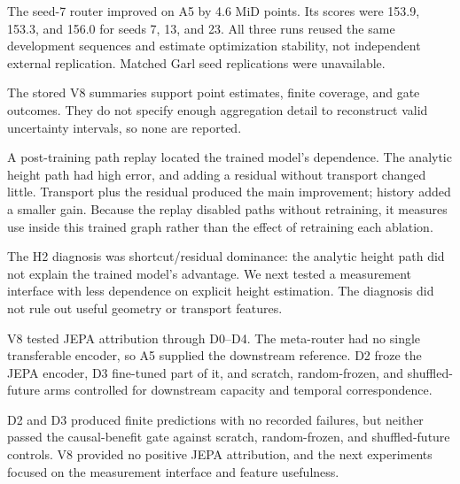 \begin{table}[htbp]
\centering\small

\caption{V8 seed-7 MiD and finite coverage for the router and temporal-representation arms.}
\label{tab:early-v8}
\end{table}

The seed-7 router improved on A5 by 4.6 MiD points. Its scores were 153.9, 153.3, and 156.0 for seeds 7, 13, and 23. All three runs reused the same development sequences and estimate optimization stability, not independent external replication. Matched Garl seed replications were unavailable. 

The stored V8 summaries support point estimates, finite coverage, and gate outcomes. They do not specify enough aggregation detail to reconstruct valid uncertainty intervals, so none are reported.

A post-training path replay located the trained model's dependence. The analytic height path had high error, and adding a residual without transport changed little. Transport plus the residual produced the main improvement; history added a smaller gain. Because the replay disabled paths without retraining, it measures use inside this trained graph rather than the effect of retraining each ablation. 

\begin{table}[htbp]
\centering\small

\caption{V8 post-training path replay showing MiD for the analytic, residual, transport, and history paths.}
\label{tab:early-factorial}
\end{table}

The H2 diagnosis was shortcut/residual dominance: the analytic height path did not explain the trained model's advantage. We next tested a measurement interface with less dependence on explicit height estimation. The diagnosis did not rule out useful geometry or transport features. 

V8 tested JEPA attribution through D0--D4. The meta-router had no single transferable encoder, so A5 supplied the downstream reference. D2 froze the JEPA encoder, D3 fine-tuned part of it, and scratch, random-frozen, and shuffled-future arms controlled for downstream capacity and temporal correspondence. 

\begin{table}[htbp]
\centering\small

\caption{V8 JEPA attribution across nominal label fractions for D0--D4.}
\label{tab:early-jepa}
\end{table}

D2 and D3 produced finite predictions with no recorded failures, but neither passed the causal-benefit gate against scratch, random-frozen, and shuffled-future controls. V8 provided no positive JEPA attribution, and the next experiments focused on the measurement interface and feature usefulness. 
